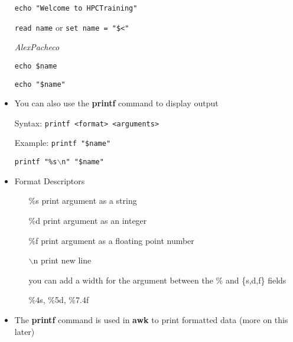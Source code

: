 \documentclass[10pt,t]{beamer}
\begin{document}
\begin{frame}
\begin{itemize}
    \item[] \texttt{echo "Welcome to HPC\quad\quad Training"}\enter
    \item[] \texttt{read name\enter} or \texttt{set name = "\$<"\enter}
    \item[] \textit{Alex\quad\quad\quad Pacheco\enter}
    \item[] \texttt{echo \$name\enter}
    \item[] \texttt{echo "\$name"\enter}
    \framebreak
    \item You can also use the \textbf{printf} command to display output
    \item[]Syntax: \texttt{printf <format> <arguments>}
    \item[]Example: \texttt{printf "\$name"\enter}
    \item[] \texttt{printf "\%s$\backslash$n" "\$name"\enter}
    \item Format Descriptors
    \begin{enumerate}
        \item[\%s] print argument as a string
        \item[\%d] print argument as an integer
        \item[\%f] print argument as a floating point number
        \item[$\backslash$n] print new line
        \item[] you can add a width for the argument between the \% and \{s,d,f\} fields
        \item[] \%4s, \%5d, \%7.4f
    \end{enumerate}
    \item The \textbf{printf} command is used in \textbf{awk} to print formatted data (more on this later) 
  \end{itemize}
\end{frame}
\end{document}
